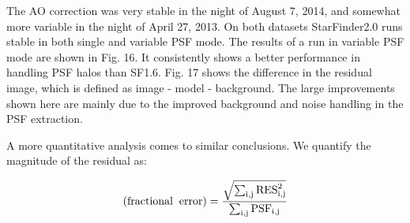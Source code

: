 The AO correction was very stable in the night of August 7, 2014, and somewhat more variable in the night of April 27, 2013. On both datasets StarFinder2.0 runs stable in both single and variable PSF mode. The results of a run in variable PSF mode are shown in Fig. 16. It consistently shows a better performance in handling PSF halos than SF1.6. Fig. 17 shows the difference in the residual image, which is defined as image - model - background. The large improvements shown here are mainly due to the improved background and noise handling in the PSF extraction.

A more quantitative analysis comes to similar conclusions. We quantify the magnitude of the residual as:

\begin{equation}
\rm(fractional \; \; error) = \frac{\sqrt{\sum_{i,j}\rm{RES}^2_{i,j}}}{\sum_{i,j}\rm{PSF}_{i,j}}
\end{equation}
  
  
  
  
  
  
  